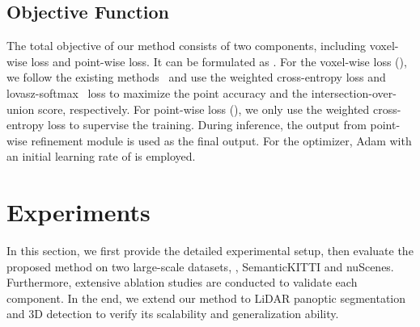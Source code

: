 \documentclass[final]{cvpr}
\begin{document}
\subsection{Objective Function}

The total objective of our method consists of two components, including voxel-wise loss and point-wise loss. It can be formulated as .
For the voxel-wise loss (), we follow the existing methods~\cite{cortinhal2020salsanext,hu2020randla} and use the weighted cross-entropy loss and lovasz-softmax~\cite{berman2018lovasz} loss to maximize the point accuracy and the intersection-over-union score, respectively. For point-wise loss (), we only use the weighted cross-entropy loss to supervise the training. During inference, the output from point-wise refinement module is used as the final output. For the optimizer, Adam with an initial learning rate of  is employed. 



 


\section{Experiments}

In this section, we first provide the detailed experimental setup, then evaluate the proposed method on two large-scale datasets, \ie, SemanticKITTI and nuScenes. Furthermore, extensive ablation studies are conducted to validate each component. In the end, we extend our method to LiDAR panoptic segmentation and 3D detection to verify its scalability and generalization ability. 
\end{document}
